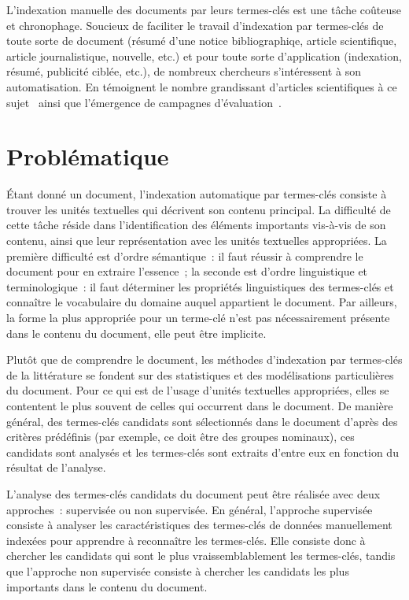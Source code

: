     L'indexation manuelle des documents par leurs termes-clés est une tâche
    coûteuse et chronophage. Soucieux de faciliter le travail d'indexation par
    termes-clés de toute sorte de document (résumé d'une notice bibliographiqe,
    article scientifique, article journalistique, nouvelle, etc.) et pour toute
    sorte d'application (indexation, résumé, publicité ciblée, etc.), de
    nombreux chercheurs s'intéressent à son automatisation. En témoignent le
    nombre grandissant d'articles scientifiques à ce
    sujet~\cite{hasan2014state_of_the_art} ainsi que l'émergence de campagnes
    d'évaluation~\cite{kim2010semeval,paroubek2012deft}.


  \section{Problématique}
  \label{sec:main-introduction-problem_statement}
    Étant donné un document, l'indexation automatique par termes-clés consiste à
    trouver les unités textuelles qui décrivent son contenu principal. La
    difficulté de cette tâche réside dans l'identification des éléments
    importants vis-à-vis de son contenu, ainsi que leur représentation avec les
    unités textuelles appropriées. La première difficulté est d'ordre
    sémantique~: il faut réussir à comprendre le document pour en extraire
    l'essence~; la seconde est d'ordre linguistique et terminologique~: il faut
    déterminer les propriétés linguistiques des termes-clés et connaître le
    vocabulaire du domaine auquel appartient le document. Par ailleurs, la forme
    la plus appropriée pour un terme-clé n'est pas nécessairement présente dans
    le contenu du document, elle peut être implicite.

    Plutôt que de comprendre le document, les méthodes d'indexation par
    termes-clés de la littérature se fondent sur des statistiques et
    des modélisations particulières du document. Pour ce qui est de l'usage
    d'unités textuelles appropriées, elles se contentent le plus souvent de
    celles qui occurrent dans le document. De manière général, des
    termes-clés candidats sont sélectionnés dans le document d'après des
    critères prédéfinis (par exemple, ce doit être des groupes nominaux), ces
    candidats sont analysés et les termes-clés sont extraits d'entre eux en
    fonction du résultat de l'analyse.

    L'analyse des termes-clés candidats du document peut être réalisée avec deux
    approches~: supervisée ou non supervisée. En général, l'approche supervisée
    consiste à analyser les caractéristiques des termes-clés de données
    manuellement indexées pour apprendre à reconnaître les termes-clés. Elle
    consiste donc à chercher les candidats qui sont le plus vraissemblablement
    les termes-clés, tandis que l'approche non supervisée consiste à chercher
    les candidats les plus importants dans le contenu du document.
    
